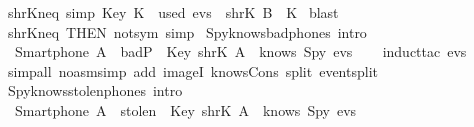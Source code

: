 \begin{isabellebody}
  \isanewline
  \isamarkupfalse%
  \ shrK{\isacharunderscore}neq\ {\isacharbrackleft}simp{\isacharbrackright}{\isacharcolon}\ {\isachardoublequoteopen}Key\ K\ {\isasymnotin}\ used\ evs\ {\isasymLongrightarrow}\ shrK\ B\ {\isasymnoteq}\ K{\isachardoublequoteclose}\isanewline
  \isadelimproof
  \endisadelimproof
  \isatagproof
  \isamarkupfalse%
  \ blast%
  \endisatagproof
  {\isafoldproof}%
  \isadelimproof
  \isanewline
  \endisadelimproof
  \isanewline
  \isamarkupfalse%
  \ shrK{\isacharunderscore}neq\ {\isacharbrackleft}THEN\ not{\isacharunderscore}sym{\isacharcomma}\ simp{\isacharbrackright}%
  \isadelimdocument
  \endisadelimdocument
  \isatagdocument
  \isamarkuptrue%
  \endisatagdocument
  {\isafolddocument}%
  \isadelimdocument
  \endisadelimdocument
  \isamarkupfalse%
  \ Spy{\isacharunderscore}knows{\isacharunderscore}bad{\isacharunderscore}phones\ {\isacharbrackleft}intro{\isacharbang}{\isacharbrackright}\ {\isacharcolon}\isanewline
  \ \ {\isachardoublequoteopen}Smartphone\ A\ {\isasymin}\ badP\ {\isasymLongrightarrow}\ Key\ {\isacharparenleft}shrK\ A{\isacharparenright}\ {\isasymin}\ knows\ Spy\ evs{\isachardoublequoteclose}\isanewline
  \isadelimproof
  \isanewline
  \ \ %
  \endisadelimproof
  \isatagproof
  \isamarkupfalse%
  \ {\isacharparenleft}induct{\isacharunderscore}tac\ {\isachardoublequoteopen}evs{\isachardoublequoteclose}{\isacharparenright}\isanewline
  \ \ \isamarkupfalse%
  \ {\isacharparenleft}simp{\isacharunderscore}all\ {\isacharparenleft}no{\isacharunderscore}asm{\isacharunderscore}simp{\isacharparenright}\ add{\isacharcolon}\ imageI\ knows{\isacharunderscore}Cons\ split{\isacharcolon}\ event{\isachardot}split{\isacharparenright}\isanewline
  \isamarkupfalse%
  \endisatagproof
  {\isafoldproof}%
  \isadelimproof
  \isanewline
  \endisadelimproof
  \isanewline
  \isanewline
  \isamarkupfalse%
  \ Spy{\isacharunderscore}knows{\isacharunderscore}stolen{\isacharunderscore}phones\ {\isacharbrackleft}intro{\isacharbang}{\isacharbrackright}\ {\isacharcolon}\isanewline
  \ \ {\isachardoublequoteopen}Smartphone\ A\ {\isasymin}\ stolen\ {\isasymLongrightarrow}\ Key\ {\isacharparenleft}shrK\ A{\isacharparenright}\ {\isasymin}\ knows\ Spy\ evs{\isachardoublequoteclose}\isanewline
  \isadelimproof
  \isanewline
  \ \ %
  \endisadelimproof
  \isatagproof
  \isamarkupfalse%

\end{isabellebody}
